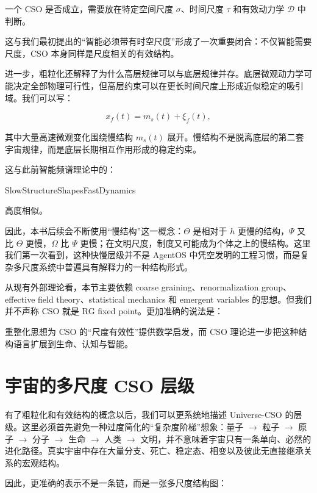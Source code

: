 一个 CSO 是否成立，需要放在特定空间尺度 $\sigma$、时间尺度 $\tau$ 和有效动力学 $\mathcal D$ 中判断。

这与我们最初提出的“智能必须带有时空尺度”形成了一次重要闭合：不仅智能需要尺度，CSO 本身同样是尺度相关的有效结构。

进一步，粗粒化还解释了为什么高层规律可以与底层规律并存。底层微观动力学可能决定全部物理可行性，但高层约束可以在更长时间尺度上形成近似稳定的吸引域。我们可以写：

\[
x_f(t)
=
m_s(t)+\xi_f(t),
\]

其中大量高速微观变化围绕慢结构 $m_s(t)$ 展开。慢结构不是脱离底层的第二套宇宙规律，而是底层长期相互作用形成的稳定约束。

这与此前智能频谱理论中的：

\begin{statementbox}
SlowStructureShapesFastDynamics
\end{statementbox}

高度相似。

因此，本书后续会不断使用“慢结构”这一概念：$\Theta$ 是相对于 $h$ 更慢的结构，$\Psi$ 又比 $\Theta$ 更慢，$\Omega$ 比 $\Psi$ 更慢；在文明尺度，制度又可能成为个体之上的慢结构。这里我们第一次看到，这种快慢层级并不是 AgentOS 中凭空发明的工程习惯，而是复杂多尺度系统中普遍具有解释力的一种结构形式。

从现有外部理论看，本节主要依赖 coarse graining、renormalization group、effective field theory、statistical mechanics 和 emergent variables 的思想。但我们并不声称 CSO 就是 RG fixed point。更加准确的说法是：

\begin{statementbox}
重整化思想为 CSO 的“尺度有效性”提供数学启发，而 CSO 理论进一步把这种结构语言扩展到生命、认知与智能。
\end{statementbox}

\section{宇宙的多尺度 CSO 层级}

有了粗粒化和有效结构的概念以后，我们可以更系统地描述 Universe-CSO 的层级。这里必须首先避免一种过度简化的“复杂度阶梯”想象：量子 $\rightarrow$ 粒子 $\rightarrow$ 原子 $\rightarrow$ 分子 $\rightarrow$ 生命 $\rightarrow$ 人类 $\rightarrow$ 文明，并不意味着宇宙只有一条单向、必然的进化路径。真实宇宙中存在大量分支、死亡、稳定态、相变以及彼此无直接继承关系的宏观结构。

因此，更准确的表示不是一条链，而是一张多尺度结构图：

